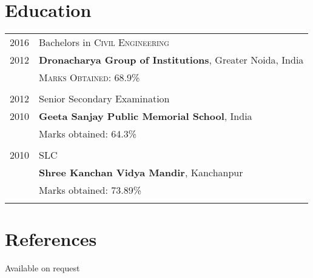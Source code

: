\documentclass[a4paper,10pt]{article}
\begin{document}
\section{Education}
\begin{tabular}{rl}	
2016  & Bachelors in \textsc{Civil Engineering}\\
2012 & \textbf{Dronacharya Group of Institutions}, Greater Noida, India\\
& \normalsize \textsc{Marks Obtained}: 68.9\% \\\\
2012 & Senior Secondary Examination \\ 
2010 &\normalsize\textbf{Geeta Sanjay Public Memorial School}, India\\
&Marks obtained: 64.3\%\\&\\
2010& SLC\\ & \textbf{Shree Kanchan Vidya Mandir}, Kanchanpur\\
&Marks obtained: 73.89\%\\&\\
\end{tabular}


\section{References}
Available on request
\end{document}
